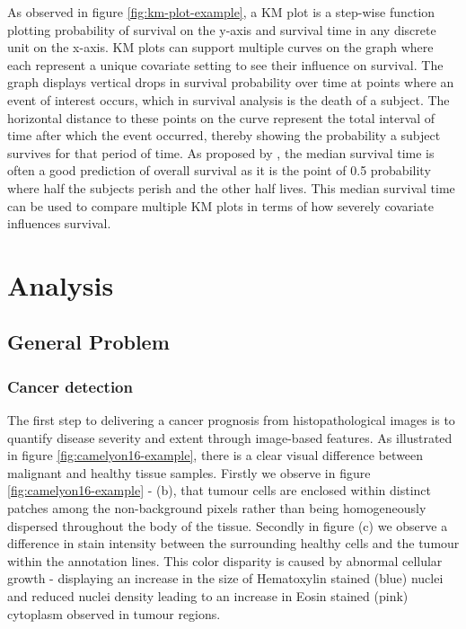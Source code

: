 \documentclass{l4proj}
\begin{document}
As observed in figure \ref{fig:km-plot-example}, a KM plot is a step-wise function plotting probability of survival on the y-axis and survival time in any discrete unit on the x-axis. KM plots can support multiple curves on the graph where each represent a unique covariate setting to see their influence on survival. The graph displays vertical drops in survival probability over time at points where an event of interest occurs, which in survival analysis is the death of a subject. The horizontal distance to these points on the curve represent the total interval of time after which the event occurred, thereby showing the probability a subject survives for that period of time. As proposed by \cite{bewick2004statistics}, the median survival time is often a good prediction of overall survival as it is the point of 0.5 probability where half the subjects perish and the other half lives. This median survival time can be used to compare multiple KM plots in terms of how severely  covariate influences survival.  

\chapter{Analysis}
\section{General Problem}
\subsection{Cancer detection} \label{cancer-general-problem}
The first step to delivering a cancer prognosis from histopathological images is to quantify disease severity and extent through image-based features. As illustrated in figure \ref{fig:camelyon16-example}, there is a clear visual difference between malignant and healthy tissue samples. Firstly we observe in figure \ref{fig:camelyon16-example} - (b), that tumour cells are enclosed within distinct patches among the non-background pixels rather than being homogeneously dispersed throughout the body of the tissue. Secondly in figure (c) we observe a difference in stain intensity between the surrounding healthy cells and the tumour within the annotation lines. This color disparity is caused by abnormal cellular growth - displaying an increase in the size of Hematoxylin stained (blue) nuclei and reduced nuclei density leading to an increase in Eosin stained (pink) cytoplasm observed in tumour regions. 
\end{document}
